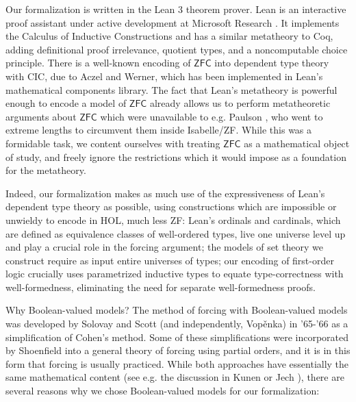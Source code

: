\documentclass[a4paper,USenglish,cleveref, autoref]{lipics-v2019}
\begin{document}
Our formalization is written in the Lean 3 theorem prover. Lean is an interactive proof assistant under active development at Microsoft Research \cite{de2015lean} \cite{sebastian-slides}. It implements the Calculus of Inductive Constructions and has a similar metatheory to Coq, adding definitional proof irrelevance, quotient types, and a noncomputable choice principle. There is a well-known encoding of $\mathsf{ZFC}$ into dependent type theory with CIC, due to Aczel and Werner, which has been implemented in Lean's mathematical components library. The fact that Lean's metatheory is powerful enough to encode a model of $\mathsf{ZFC}$ already allows us to perform metatheoretic arguments about $\mathsf{ZFC}$ which were unavailable to e.g. Paulson \cite{paulson2003relative}, who went to extreme lengths to circumvent them inside Isabelle/ZF. While this was a formidable task, we content ourselves with treating $\mathsf{ZFC}$ as a mathematical object of study, and freely ignore the restrictions which it would impose as a foundation for the metatheory.

Indeed, our formalization makes as much use of the expressiveness of Lean's dependent type theory as possible, using constructions which are impossible or unwieldy to encode in HOL, much less ZF: Lean's ordinals and cardinals, which are defined as equivalence classes of well-ordered types, live one universe level up and play a crucial role in the forcing argument; the models of set theory we construct require as input entire universes of types; our encoding of first-order logic crucially uses parametrized inductive types to equate type-correctness with well-formedness, eliminating the need for separate well-formedness proofs.

Why Boolean-valued models? The method of forcing with Boolean-valued models was developed by Solovay and Scott (and independently, Vop{\v e}nka) in '65-'66 \cite{scott1} \cite{vopenka1} as a simplification of Cohen's method. Some of these simplifications were incorporated by Shoenfield \cite{solovay1} into a general theory of forcing using partial orders, and it is in this form that forcing is usually practiced. While both approaches have essentially the same mathematical content (see e.g. the discussion in Kunen \cite{kunen1} or Jech \cite{jech1}), there are several reasons why we chose Boolean-valued models for our formalization:
\end{document}
